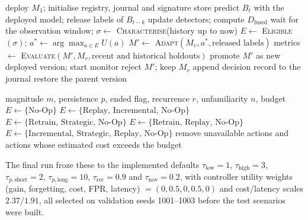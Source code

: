 \documentclass{article}
\begin{document}
\begin{algorithm}[h]
\caption{EVO-X evolution loop}
\label{alg:loop}
\small
\begin{algorithmic}[1]
\State deploy $M_1$; initialise registry, journal and signature store
  \State predict $B_t$ with the deployed model; release labels of $B_{t-k}$
  \State update detectors; compute $D_{\text{fused}}$
    \State wait for the observation window; $\sigma\gets$ \textsc{Characterise}(history up to now)
    \State $E\gets$ \textsc{Eligible}$(\sigma)$; $a^{*}\gets\arg\max_{a\in E}U(a)$
      \State $M'\gets$ \textsc{Adapt}$(M_v,a^{*},\text{released labels})$
      \State metrics $\gets$ \textsc{Evaluate}$(M',M_v,\text{recent and historical holdouts})$
       \State promote $M'$ as new deployed version; start monitor
      \Else \State reject $M'$; keep $M_v$ \EndIf
    \EndIf
    \State append decision record to the journal
  \EndIf
   \State restore the parent version \EndIf
\EndFor
\end{algorithmic}
\end{algorithm}

\begin{algorithm}[h]
\caption{Eligibility rules (thresholds are parameters; implemented defaults in text)}
\label{alg:rules}
\small
\begin{algorithmic}[1]
\Require magnitude $m$, persistence $p$, ended flag, recurrence $r$, unfamiliarity $n$, budget
 \State $E\gets\{\text{No-Op}\}$
 \State $E\gets\{\text{Replay, Incremental, No-Op}\}$
 \State $E\gets\{\text{Retrain, Strategic, No-Op}\}$
 \State $E\gets\{\text{Retrain, Replay, No-Op}\}$
\Else \State $E\gets\{\text{Incremental, Strategic, Replay, No-Op}\}$
\EndIf
\State remove unavailable actions and actions whose estimated cost exceeds the budget
\end{algorithmic}
\end{algorithm}
The final run froze these to the implemented defaults $\tau_{\text{low}}=1$, $\tau_{\text{high}}=3$, $\tau_{p,\text{short}}=2$, $\tau_{p,\text{long}}=10$, $\tau_{\text{rec}}=0.9$ and $\tau_{\text{nov}}=0.2$, with controller utility weights (gain, forgetting, cost, FPR, latency) $=(0,0.5,0,0.5,0)$ and cost/latency scales $2.37$/$1.91$, all selected on validation seeds 1001--1003 before the test scenarios were built.
\end{document}
